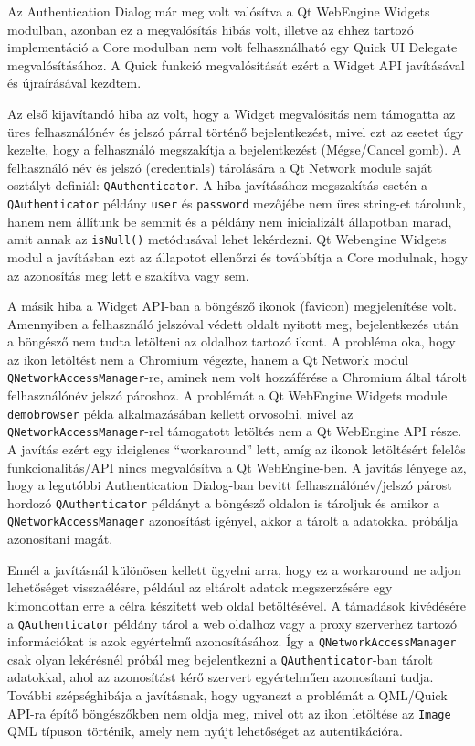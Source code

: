 \documentclass[12pt]{report}
\begin{document}
Az Authentication Dialog már meg volt valósítva a Qt WebEngine Widgets modulban, azonban
ez a megvalósítás hibás volt, illetve az ehhez tartozó implementáció a Core modulban nem
volt felhasználható egy Quick UI Delegate megvalósításához. A Quick funkció megvalósítását
ezért a Widget API javításával és újraírásával kezdtem.

Az első kijavítandó hiba az volt, hogy a Widget megvalósítás nem támogatta az üres
felhasználónév és jelszó párral történő bejelentkezést, mivel ezt az esetet úgy kezelte,
hogy a felhasználó megszakítja a bejelentkezést (Mégse/Cancel gomb). A felhasználó név
és jelszó (credentials) tárolására a Qt Network module saját osztályt definiál:
\texttt{QAuthenticator}. A hiba javításához megszakítás esetén a \texttt{QAuthenticator}
példány \texttt{user} és \texttt{password} mezőjébe nem üres string-et tárolunk, hanem
nem állítunk be semmit és a példány nem inicializált állapotban marad, amit annak az
\texttt{isNull()} metódusával lehet lekérdezni. Qt Webengine Widgets modul a javításban
ezt az állapotot ellenőrzi és továbbítja a Core modulnak, hogy az azonosítás meg lett e
szakítva vagy sem.

A másik hiba a Widget API-ban a böngésző ikonok (favicon) megjelenítése volt. Amennyiben a
felhasználó jelszóval védett oldalt nyitott meg, bejelentkezés után a böngésző nem tudta
letölteni az oldalhoz tartozó ikont. A probléma oka, hogy az ikon letöltést nem a Chromium
végezte, hanem a Qt Network modul \texttt{QNetworkAccessManager}-re, aminek nem volt
hozzáférése a Chromium által tárolt felhasználónév jelszó pároshoz. A problémát a
Qt WebEngine Widgets module \texttt{demobrowser} példa alkalmazásában kellett orvosolni,
mivel az \texttt{QNetworkAccessManager}-rel támogatott letöltés nem a Qt WebEngine API része.
A javítás ezért egy ideiglenes ``workaround'' lett, amíg az ikonok letöltésért felelős
funkcionalitás/API nincs megvalósítva a Qt WebEngine-ben. A javítás lényege az, hogy a
legutóbbi Authentication Dialog-ban bevitt felhasználónév/jelszó párost hordozó
\texttt{QAuthenticator} példányt a böngésző oldalon is tároljuk és amikor a
\texttt{QNetworkAccessManager} azonosítást igényel, akkor a tárolt a adatokkal próbálja
azonosítani magát.

Ennél a javításnál különösen kellett ügyelni arra, hogy ez a workaround ne adjon lehetőséget
visszaélésre, például az eltárolt adatok megszerzésére egy kimondottan erre a célra
készített web oldal betöltésével. A támadások kivédésére a \texttt{QAuthenticator} példány
tárol a web oldalhoz vagy a proxy szerverhez tartozó információkat is azok egyértelmű
azonosításához. Így a \texttt{QNetworkAccessManager} csak olyan lekérésnél próbál meg
bejelentkezni a \texttt{QAuthenticator}-ban tárolt adatokkal, ahol az azonosítást kérő
szervert egyértelműen azonosítani tudja. További szépséghibája a javításnak, hogy
ugyanezt a problémát a QML/Quick API-ra építő böngészőkben nem oldja meg, mivel ott az ikon
letöltése az \texttt{Image} QML típuson történik, amely nem nyújt lehetőséget az
autentikációra.
\end{document}
